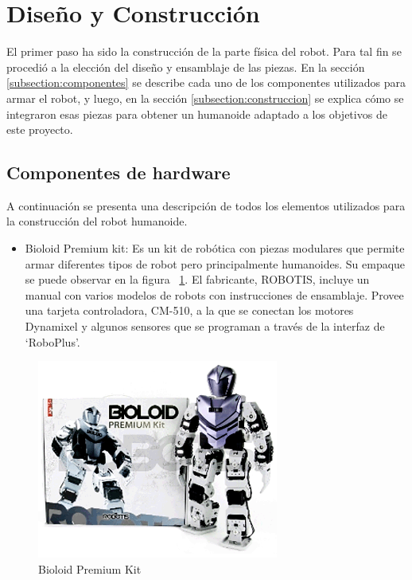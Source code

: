 
\label{chapter:diseno}
\section{Diseño y Construcción}

El primer paso ha sido la construcci\'on de la parte física del robot. Para tal fin se procedió a la elección del diseño y ensamblaje de las piezas. En la sección \ref{subsection:componentes} se describe cada uno de los componentes utilizados para armar el robot, y luego, en la secci\'on \ref{subsection:construccion} se explica cómo se integraron esas piezas para obtener un humanoide adaptado a los objetivos de este proyecto.

\label{subsection:componentes}
\subsection{Componentes de hardware}
A continuación se presenta una descripción de todos los elementos utilizados para la construcción del robot humanoide. 

\begin{itemize}
\item Bioloid Premium kit: Es un kit de robótica con piezas modulares que permite armar diferentes tipos de robot pero principalmente humanoides. Su empaque se puede observar en la figura ~\ref{fig:kit}. El fabricante, ROBOTIS, incluye un manual con varios modelos de robots con instrucciones de ensamblaje. Provee una tarjeta controladora, CM-510, a la que se conectan los motores Dynamixel y algunos sensores que se programan a través de la interfaz de ‘RoboPlus’\cite{robotics}. 

\end{itemize}

\begin{figure}[hbtp]

\centering
\includegraphics[scale=0.5]{imagenes/product_bioloid17.png}
\caption{Bioloid Premium Kit}
\label{fig:kit}
\end{figure}

